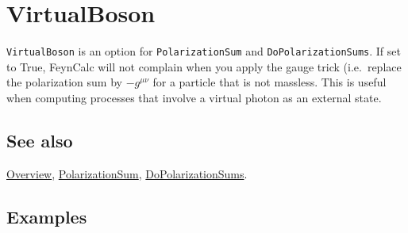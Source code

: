 \documentclass[../FeynCalcManual.tex]{subfiles}
\begin{document}
\hypertarget{virtualboson}{%
\section{VirtualBoson}\label{virtualboson}}

\texttt{VirtualBoson} is an option for \texttt{PolarizationSum} and
\texttt{DoPolarizationSums}. If set to True, FeynCalc will not complain
when you apply the gauge trick (i.e.~replace the polarization sum by
\(- g^{\mu \nu}\) for a particle that is not massless. This is useful
when computing processes that involve a virtual photon as an external
state.

\subsection{See also}

\hyperlink{toc}{Overview}, \hyperlink{polarizationsum}{PolarizationSum},
\hyperlink{dopolarizationsums}{DoPolarizationSums}.

\subsection{Examples}
\end{document}
